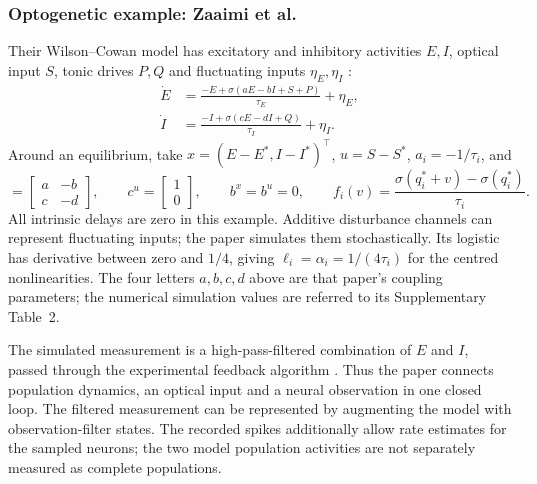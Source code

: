 ﻿\documentclass[11pt,a4paper]{article}
\begin{document}
\subsubsection*{Optogenetic example: Zaaimi et al.}
Their Wilson--Cowan model has excitatory and inhibitory activities
$E,I$, optical input $S$, tonic drives $P,Q$ and fluctuating inputs
$\eta_E,\eta_I$ \cite[PDF p.~15, Eqs.~3--4]{zaaimi2023}:
\begin{equation*}
\begin{aligned}
\dot E&=\frac{-E+\sigma(aE-bI+S+P)}{\tau_E}+\eta_E,\\
\dot I&=\frac{-I+\sigma(cE-dI+Q)}{\tau_I}+\eta_I.
\end{aligned}
\end{equation*}
Around an equilibrium, take $x=(E-E^*,I-I^*)^\top$, $u=S-S^*$,
$a_i=-1/\tau_i$, and
\begin{equation*}
[c^x_{ij}]=\begin{bmatrix}a&-b\\c&-d\end{bmatrix},\qquad
c^u=\begin{bmatrix}1\\0\end{bmatrix},\qquad
b^x=b^u=0,\qquad
f_i(v)=\frac{\sigma(q_i^*+v)-\sigma(q_i^*)}{\tau_i}.
\end{equation*}
All intrinsic delays are zero in this example. Additive disturbance
channels can represent fluctuating inputs; the paper simulates them
stochastically. Its logistic has derivative between zero and $1/4$,
giving $\ell_i=\alpha_i=1/(4\tau_i)$ for the centred nonlinearities.
The four letters $a,b,c,d$ above are that paper's coupling parameters;
the numerical simulation values are referred to its Supplementary
Table~2.

The simulated measurement is a high-pass-filtered combination of
$E$ and $I$, passed through the experimental feedback algorithm
\cite[PDF pp.~9, 15]{zaaimi2023}. Thus the paper connects population
dynamics, an optical input and a neural observation in one closed loop.
The filtered measurement can be represented by augmenting the model
with observation-filter states. The recorded spikes additionally allow
rate estimates for the sampled neurons; the two model population
activities are not separately measured as complete populations.
\end{document}
